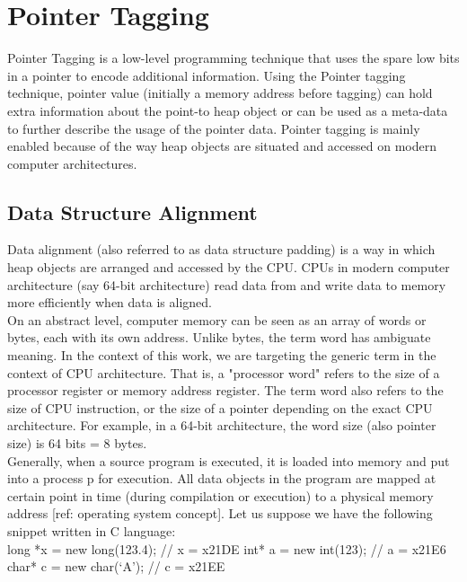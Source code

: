 \section{Pointer Tagging}
\label{sec:preliminaries:pointertagging}

Pointer Tagging is a low-level programming technique that uses the spare low bits in a pointer to encode additional information. Using the Pointer tagging technique, pointer value (initially a memory address before tagging) can hold extra information about the point-to heap object or can be used as a meta-data to further describe the usage of the pointer data. Pointer tagging is mainly enabled because of the way heap objects are situated and accessed on modern computer architectures.

\subsection{Data Structure Alignment}

Data alignment (also referred to as data structure padding) is a way in which heap objects are arranged and accessed by the CPU. CPUs in modern computer architecture (say 64-bit architecture) read data from and write data to memory more efficiently when data is aligned. 
\\

On an abstract level, computer memory can be seen as an array of words or bytes, each with its own address. Unlike bytes, the term word has ambiguate meaning. In the context of this work, we are targeting the generic term in the context of CPU architecture. That is, a "processor word" refers to the size of a processor register or memory address register. The term word also refers to the size of CPU instruction, or the size of a pointer depending on the exact CPU architecture. For example, in a 64-bit architecture, the word size (also pointer size) is 64 bits = 8 bytes.
\\

Generally, when a source program is executed, it is loaded into memory and put into a process p for execution. All data objects in the program are mapped at certain point in time (during compilation or execution) to a physical memory address [ref: operating system concept]. Let us suppose we have the following snippet written in C language:
\\

long *x = new long(123.4); // x = x21DE
int* a = new int(123);  // a = x21E6
char* c = new char(‘A’);  // c = x21EE

